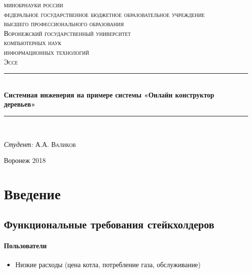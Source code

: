 \documentclass[bibliography=totocnumbered]{scrartcl}
\begin{document}
\begin{titlepage}
\newcommand{\HRule}{\rule{\linewidth}{0.5mm}}
\center
\textsc {
\footnotesize{
минобрнауки россии\\
федеральное государственное бюджетное образовательное учреждение\\
высшего профессионального образования}\\
\large{Воронежский государственный университет}
}\\[1.0cm]
\textsc{ компьютерных наук}\\
\textsc{ информационных технологий}\\[1.0cm] 
\textsc{\Large Эссе}\\[0.5cm]
\HRule \\[0.4cm]
{ \huge \bfseries Системная инженерия на примере системы «Онлайн конструктор деревьев»}\\[0.4cm] %
\HRule \\[1.5cm]


\begin{flushleft} \large
\emph{Студент:} А.А. \textsc{Валиков} \\
\end{flushleft}

\vfill
\begin{center}
Воронеж 2018
\end{center}
\end{titlepage}

\tableofcontents

\newpage

\section{Введение}

\subsection{Функциональные требования стейкхолдеров}

\paragraph{Пользователи}
\begin{itemize}
    \item Низкие расходы (цена котла, потребление газа, обслуживание)
\end{itemize}
\end{document}

